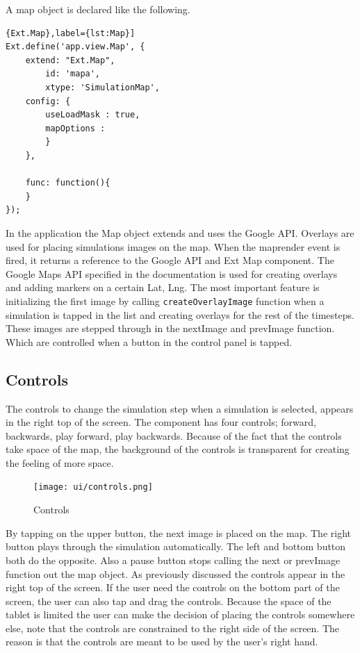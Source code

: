 A map object is declared like the following.
\begin{lstlisting}{Ext.Map},label={lst:Map}]
Ext.define('app.view.Map', {
	extend: "Ext.Map",
		id: 'mapa',
		xtype: 'SimulationMap',
	config: {
		useLoadMask : true,
		mapOptions : 
		}
	},
	
	func: function(){
	}
});	
\end{lstlisting}
In the application the Map object extends and uses the Google API. Overlays are used for placing simulations images on the map. When the maprender event is fired, it returns a reference to the Google API and Ext Map component. The Google Maps API specified in the documentation is used for creating overlays and adding markers on a certain Lat, Lng. The most important feature is initializing the first image by calling \texttt{createOverlayImage} function when a simulation is tapped in the list and creating overlays for the rest of the timesteps. These images are stepped through in the nextImage and prevImage function. Which are controlled when a button in the control panel is tapped.

\subsection{Controls}
The controls to change the simulation step when a simulation is selected, appears in the right top of the screen. The component has four controls; forward, backwards, play forward, play backwards. Because of the fact that the controls take space of the map, the background of the controls is transparent for creating the feeling of more space.
\begin{figure}[H]
\center
\texttt{[image: ui/controls.png]}
\caption{Controls}
\label{fig:controls}
\end{figure}
By tapping on the upper button, the next image is placed on the map. The right button plays through the simulation automatically. The left and bottom button both do the opposite. Also a pause button stops calling the next or prevImage function out the map object. As previously discussed the controls appear in the right top of the screen. If the user need the controls on the bottom part of the screen, the user can also tap and drag the controls. Because the space of the tablet is limited the user can make the decision of placing the controls somewhere else, note that the controls are constrained to the right side of the screen. The reason is that the controls are meant to be used by the user's right hand.
 
